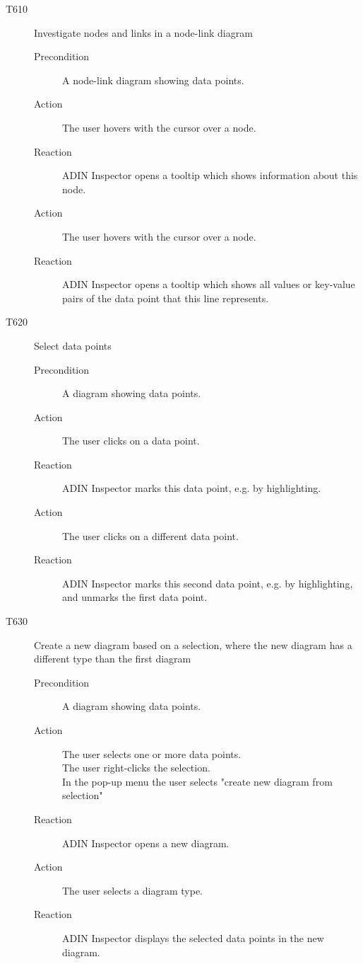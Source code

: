 \documentclass[twoside, english, final]{Pflichtenheft}
\begin{document}
\begin{description}
	\item[T610] Investigate nodes and links in a node-link diagram
	      \begin{description}
		      \item[Precondition]
		            A node-link diagram showing data points.
		      \item[Action]
		            The user hovers with the cursor over a node.
		      \item[Reaction]
		            ADIN Inspector opens a tooltip which shows information about this node.
		      \item[Action]
		            The user hovers with the cursor over a node.
		      \item[Reaction]
		            ADIN Inspector opens a tooltip which shows all values or key-value pairs of the data point that this line represents.

	      \end{description}

	\item[T620] Select data points
	      \begin{description}
		      \item[Precondition]
		            A diagram showing data points.
		      \item[Action]
		            The user clicks on a data point.
		      \item[Reaction]
		            ADIN Inspector marks this data point, e.g. by highlighting.
		      \item[Action]
		            The user clicks on a different data point.
		      \item[Reaction]
		            ADIN Inspector marks this second data point, e.g. by highlighting, and unmarks the first data point.
	      \end{description}

	\item[T630] Create a new diagram based on a selection, where the new diagram has a different type than the first diagram
	      \begin{description}
		      \item[Precondition]
		            A diagram showing data points.
		      \item[Action]
		            The user selects one or more data points. \\
		            The user right-clicks the selection. \\
		            In the pop-up menu the user selects "create new diagram from selection"

		      \item[Reaction]
		            ADIN Inspector opens a new diagram.
		      \item[Action]
		            The user selects a diagram type.
		      \item[Reaction]
		            ADIN Inspector displays the selected data points in the new diagram.
	      \end{description}


\end{description}
\end{document}
